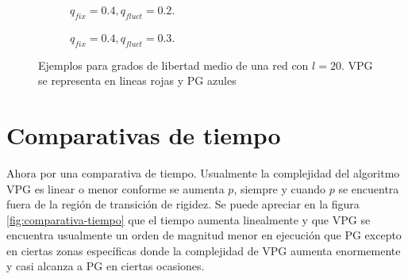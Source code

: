 \begin{figure}
	\begin{subfigure}{0.45\textwidth}
  \caption{$q_{fix}=0.4, q_{fluct}=0.2$.}
  \end{subfigure}
  \hfill
  \begin{subfigure}{0.45\textwidth}
  \centering
  \caption{$q_{fix}=0.4, q_{fluct}=0.3$.}
  \end{subfigure}
  \caption{Ejemplos para grados de libertad medio de una red con $l = 20$. VPG se representa en lineas rojas y PG azules}
	\label{fig:comparativa-libertad}
\end{figure}

\section{Comparativas de tiempo}

Ahora por una comparativa de tiempo. Usualmente la complejidad del algoritmo VPG es linear o menor conforme se aumenta $p$, siempre y cuando $p$ se encuentra fuera de la región de transición de rigidez. Se puede apreciar en la figura \ref{fig:comparativa-tiempo} que el tiempo aumenta linealmente y que VPG se encuentra usualmente un orden de magnitud menor en ejecución que PG excepto en ciertas zonas específicas donde la complejidad de VPG aumenta enormemente y casi alcanza a PG en ciertas ocasiones.

